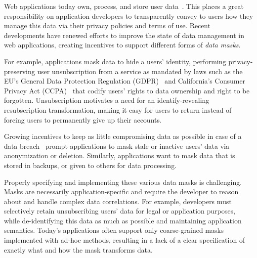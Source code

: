 
\iffalse
Web applications today own, process, and store user data~\cite{nytimes:fb, npr:data}. This places a
great responsibility on application developers to transparently convey to users how they manage this
data via their privacy policies and terms of use.
%
Recent developments have renewed efforts to improve the state of data management in web
applications, creating incentives to support different forms of \emph{data masks}.

For example, applications mask data to hide a users' identity, performing privacy-preserving user
unsubscription from a service as mandated by laws such as the EU's General Data Protection
Regulation (GDPR)~\cite{eu:gdpr} and California's Consumer Privacy Act (CCPA)~\cite{ca:privacy-act}
that codify users' rights to data ownership and right to be forgotten. Unsubscription motivates a
need for an identify-revealing resubscription transformation, making it easy for users to return
instead of forcing users to permanently give up their accounts.

Growing incentives to keep as little compromising data as possible in case of a data
breach~\cite{breach:amazon,breach:twitter, breach:fb, breach:marriott, breach:quora} prompt
applications to mask stale or inactive users' data via anonymization or deletion. Similarly,
applications want to mask data that is stored in backups, or given to others for data processing.


Properly specifying and implementing these various data masks is challenging. Masks are necessarily
application-specific and require the developer to reason about and handle complex data correlations.
For example, developers must selectively retain unsubscribing users' data for legal or application
purposes, while de-identifying this data as much as possible and maintaining application semantics.
Today's applications often support only coarse-grained masks implemented with ad-hoc methods,
resulting in a lack of a clear specification of exactly what and how the mask transforms data.

